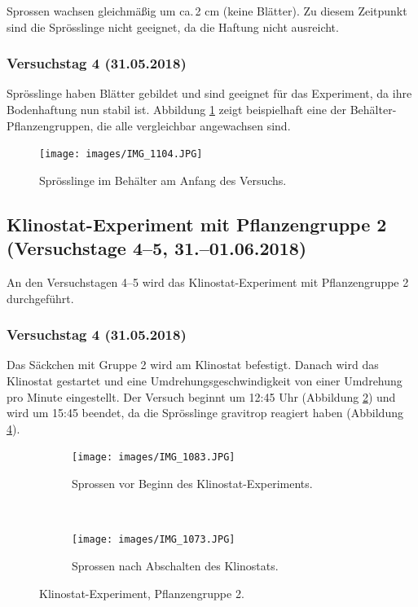 \documentclass[
11pt, 
ngerman,
listof=totocnumbered,
oneside,
bibliography=totocnumbered,
abstracton
]{scrreprt}
\begin{document}
Sprossen wachsen gleichmäßig um ca.\,2 cm (keine Blätter). Zu diesem Zeitpunkt sind die Sprösslinge nicht geeignet, da die Haftung nicht ausreicht. 

\subsubsection{Versuchstag 4 (31.05.2018)} 

Sprösslinge haben Blätter gebildet und sind geeignet für das Experiment, da ihre Bodenhaftung nun stabil ist. Abbildung \ref{amanfang} zeigt beispielhaft eine der Behälter-Pflanzengruppen, die alle vergleichbar angewachsen sind. 

\begin{figure}[H]
	\centering 
	\texttt{[image: images/IMG\_1104.JPG]}
	\caption{Sprösslinge im Behälter am Anfang des Versuchs.\label{amanfang}}
\end{figure} 

\subsection{Klinostat-Experiment mit Pflanzengruppe 2 (Versuchstage 4--5, 31.--01.06.2018)} 

An den Versuchstagen 4--5 wird das Klinostat-Experiment mit Pflanzengruppe 2 durchgeführt. 

\subsubsection{Versuchstag 4 (31.05.2018)} 

Das Säckchen mit Gruppe 2 wird am Klinostat befestigt. Danach wird das Klinostat gestartet und eine Umdrehungsgeschwindigkeit von einer Umdrehung pro Minute eingestellt. Der Versuch beginnt um 12:45 Uhr (Abbildung \ref{Foto 1}) und wird um 15:45 beendet, da die Sprösslinge gravitrop reagiert haben (Abbildung \ref{Foto 2}). 

\begin{figure}[H]
	\centering
	\begin{subfigure}[b]{0.44\textwidth}
		\texttt{[image: images/IMG\_1083.JPG]}
		\caption{Sprossen vor Beginn des Klinostat-Experiments.\label{Foto 1}}
		
	\end{subfigure}
	~ %
	\begin{subfigure}[b]{0.44\textwidth}
		\texttt{[image: images/IMG\_1073.JPG]}
		\caption{Sprossen nach Abschalten des Klinostats.\label{Foto 2}}
	\end{subfigure}
	\caption{Klinostat-Experiment, Pflanzengruppe 2.\label{Foto 2}}
\end{figure}
\end{document}
